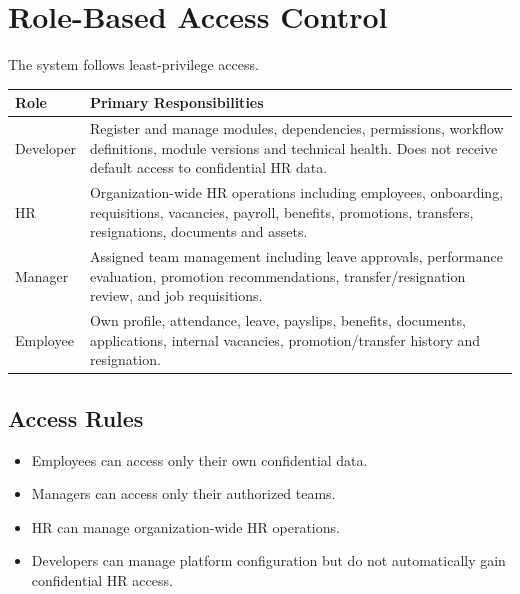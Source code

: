 \documentclass[12pt,a4paper]{article}
\begin{document}
\section{Role-Based Access Control}

The system follows least-privilege access.

\begin{center}
\begin{longtable}{@{}p{3cm}p{9cm}@{}}
\toprule
\textbf{Role} & \textbf{Primary Responsibilities} \\
\midrule

Developer &
Register and manage modules, dependencies, permissions,
workflow definitions, module versions and technical health.
Does not receive default access to confidential HR data. \\

HR &
Organization-wide HR operations including employees, onboarding,
requisitions, vacancies, payroll, benefits, promotions, transfers,
resignations, documents and assets. \\

Manager &
Assigned team management including leave approvals, performance
evaluation, promotion recommendations, transfer/resignation review,
and job requisitions. \\

Employee &
Own profile, attendance, leave, payslips, benefits, documents,
applications, internal vacancies, promotion/transfer history and
resignation. \\

\bottomrule
\end{longtable}
\end{center}

\subsection{Access Rules}

\begin{itemize}
    \item Employees can access only their own confidential data.
    \item Managers can access only their authorized teams.
    \item HR can manage organization-wide HR operations.
    \item Developers can manage platform configuration but do not
    automatically gain confidential HR access.
\end{itemize}
\end{document}
